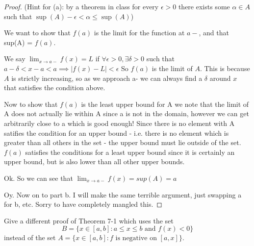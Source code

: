 \documentclass{article} %
\theoremstyle{plain}
\theoremstyle{definition}
\begin{document}
\begin{proof} (Hint for (a): by a theorem in class for every $\epsilon > 0$ there exists some $\alpha \in A$ such that $\sup(A) -\epsilon < \alpha \leq \sup(A)$)
	
  We want to show that $f(a)$ is the limit for the function at $a-$,
  and that sup(A) = $f(a)$.

  We say $\lim_{x \to a-} f(x) = L$ if $\forall \epsilon > 0, \exists
  \delta > 0 $ such that $a - \delta < x -a < a \implies |f(x) -L | < \epsilon$
  So $f(a)$ is the limit of $A$. This is because $A$ is strictly increasing,  so as we approach a- we can always find a $\delta$ around $x$ that
  satisfies the condition above.
  
  Now to show that $f(a)$ is the least upper bound for A we note that 
  the limit of A does not actually lie within A since a is not in the
  domain, however we can get arbitrarily close to a which is good enough!
  Since there is no element with A satifies the condition for an upper
  bound - i.e.  there is no element which is greater than all others in
  the set - the upper bound must lie outside of the set.  $f(a)$ 
  satisfies the conditions for a least upper bound since it is certainly
  an upper bound, but is also lower than all other upper bounds.


  Ok.  So we can see that $\lim_{x \to a-} f(x) = sup(A) = a$

  Oy.  Now on to part b.  I will make the same terrible argument,
  just swapping a for b, etc.  Sorry to have completely mangled this.


\end{proof} 





\newpage
\noindent{} Give a different proof of Theorem 7-1 which uses the set 
$$B = \{x \in [a,b] : a \leq x \leq b \text{ and } f(x) < 0\}$$
instead of the set $A = \{ x \in [a,b] : f \text{ is negative on } [a,x]\}$. 
\end{document}
